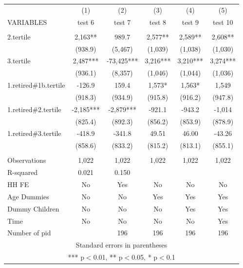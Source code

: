 \begin{tabular}{lccccc} \hline
 & (1) & (2) & (3) & (4) & (5) \\
VARIABLES & test 6 & test 7 & test 8 & test 9 & test 10 \\ \hline
 &  &  &  &  &  \\
2.tertile & 2,163** & 989.7 & 2,577** & 2,589** & 2,608** \\
 & (938.9) & (5,467) & (1,039) & (1,038) & (1,030) \\
3.tertile & 2,487*** & -73,425*** & 3,216*** & 3,210*** & 3,274*** \\
 & (936.1) & (8,357) & (1,046) & (1,044) & (1,036) \\
1.retired\#1b.tertile & -126.9 & 159.4 & 1,573* & 1,563* & 1,549 \\
 & (918.3) & (934.9) & (915.8) & (916.2) & (947.8) \\
1.retired\#2.tertile & -2,185*** & -2,879*** & -921.1 & -943.2 & -1,014 \\
 & (825.4) & (892.3) & (856.2) & (853.9) & (878.9) \\
1.retired\#3.tertile & -418.9 & -341.8 & 49.51 & 46.00 & -43.26 \\
 & (858.6) & (833.2) & (815.2) & (813.1) & (855.1) \\
 &  &  &  &  &  \\
Observations & 1,022 & 1,022 & 1,022 & 1,022 & 1,022 \\
R-squared & 0.021 & 0.150 &  &  &  \\
HH FE & No & Yes & No & No & No \\
Age Dummies & No & No & Yes & Yes & Yes \\
Dummy Children & No & No & No & Yes & Yes \\
Time & No & No & No & No & Yes \\
 Number of pid &  & 196 & 196 & 196 & 196 \\ \hline
\multicolumn{6}{c}{ Standard errors in parentheses} \\
\multicolumn{6}{c}{ *** p$<$0.01, ** p$<$0.05, * p$<$0.1} \\
\end{tabular}

